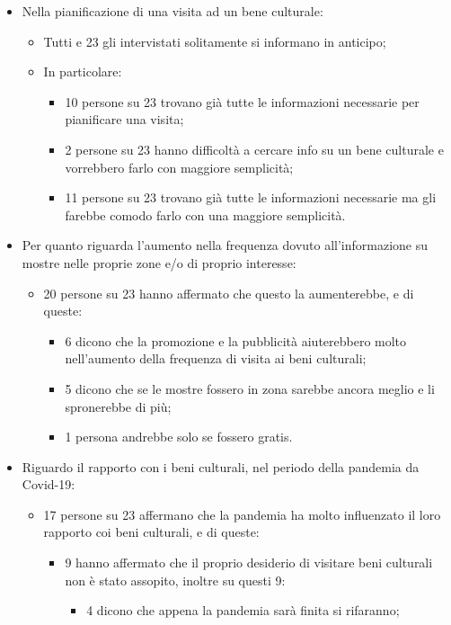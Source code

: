 \documentclass{article}
\begin{document}
\begin{itemize}
\begin{itemize}
	\end{itemize}
\item Nella pianificazione di una visita ad un bene culturale:
	\begin{itemize}
	\item Tutti e 23 gli intervistati solitamente si informano in anticipo;
	\item In particolare:
	\begin{itemize}
		\item 10 persone su 23 trovano già tutte le informazioni necessarie per pianificare una visita;
		\item 2 persone su 23 hanno difficoltà a cercare info su un bene culturale e vorrebbero farlo con maggiore semplicità;
		\item 11 persone su 23 trovano già tutte le informazioni necessarie ma gli farebbe comodo farlo con una maggiore semplicità.
		\end{itemize}
	\end{itemize}
\item Per quanto riguarda l’aumento nella frequenza dovuto all’informazione su mostre nelle proprie zone e/o di proprio interesse:
	\begin{itemize}
	\item 20 persone su 23 hanno affermato che questo la aumenterebbe, e di queste:
	\begin{itemize}
		\item 6 dicono che la promozione e la pubblicità aiuterebbero molto nell’aumento della frequenza di visita ai beni culturali;
		\item 5 dicono che se le mostre fossero in zona sarebbe ancora meglio e li spronerebbe di più;
		\item 1 persona andrebbe solo se fossero gratis.
		\end{itemize}
	\end{itemize}
\item Riguardo il rapporto con i beni culturali, nel periodo della pandemia da Covid-19:
	\begin{itemize}
	\item 17 persone su 23 affermano che la pandemia ha molto influenzato il loro rapporto coi beni culturali, e di queste:
	\begin{itemize}
		\item 9 hanno affermato che il proprio desiderio di visitare beni culturali non è stato assopito, inoltre su questi 9:
		\begin{itemize}
		\item 4 dicono che appena la pandemia sarà finita si rifaranno;

\end{itemize}
\end{itemize}
\end{itemize}
\end{itemize}
\end{document}
